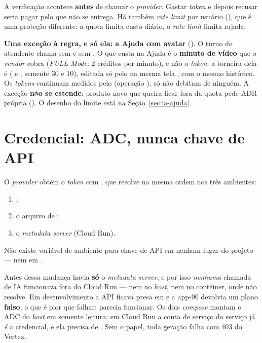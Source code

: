 \begin{nota}
A verificação acontece \textbf{antes} de chamar o \emph{provider}. Gastar
\emph{token} e depois recusar seria pagar pelo que não se entrega. Há também
\emph{rate limit} por usuário (), que é uma proteção
diferente: a quota limita custo diário, o \emph{rate limit} limita rajada.
\end{nota}

\begin{decisao}
\textbf{Uma exceção à regra, e só ela: a Ajuda com avatar} (). O
turno do atendente chama  sem  e sem
. O que custa na Ajuda é o \textbf{minuto de vídeo} que o
\emph{vendor} cobra (\emph{FULL Mode}: 2 créditos por minuto), e não o
\emph{token}: a torneira dela é  ( e
, semente 30 e 10), editada só pelo  na mesma
tela , com o mesmo histórico. Os \emph{tokens}
continuam medidos pelo  (operação
); só não debitam de ninguém. A exceção \textbf{não se
estende}: produto novo que queira ficar fora da quota pede ADR própria
(). O desenho do limite está na
Seção~\ref{sec:ia-ajuda}.
\end{decisao}

\section{Credencial: ADC, nunca chave de API}

\begin{regra}
O \emph{provider} obtém o \emph{token} com , que resolve
na mesma ordem nos três ambientes:
\begin{enumerate}
  \item {};
  \item o arquivo de ;
  \item o \emph{metadata server} (Cloud Run).
\end{enumerate}
Não existe variável de ambiente para chave de API em nenhum lugar do projeto ---
nem em .
\end{regra}

\begin{atencao}
Antes dessa mudança havia \textbf{só} o \emph{metadata server}, e por isso
\emph{nenhuma} chamada de IA funcionava fora do Cloud Run --- nem no \emph{host},
nem no contêiner, onde  não resolve. Em
desenvolvimento a API ficava presa em  e a app-90 devolvia
um plano \textbf{falso}, o que é pior que falhar: parecia funcionar. Os dois
\emph{compose} montam o ADC do \emph{host} em  somente leitura; em
Cloud Run a conta de serviço do serviço já \emph{é} a credencial, e ela precisa de
. Sem o papel, toda geração falha com 403 do Vertex.
\end{atencao}

